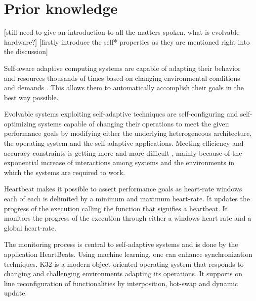 
\section{Prior knowledge}

[still need to give an introduction to all the matters spoken. what is evolvable hardware?]
[firstly introduce the self* properties as they are mentioned right into the discussion]

Self-aware adaptive computing systems are capable of adapting their behavior and resources thousands of times based on changing environmental conditions and demands \cite{selfaware}. 
This allows them to automatically accomplish their goals in the best way possible.

Evolvable systems exploiting self-adaptive techniques are self-configuring and self-optimizing systems capable of changing their operations to meet the given performance goals by modifying either the underlying heterogeneous architecture, the operating system and the self-adaptive applications. \cite{evolvable}
Meeting efficiency and accuracy constraints is getting more and more difficult , mainly because of the exponential increase of interactions among systems and the environments in which the systems are required to work. 

Heartbeat makes it possible to assert performance goals as heart-rate windows each of each is delimited by a minimum and maximum heart-rate. It updates the progress of the execution calling the function that signifies a heartbeat. It monitors the progress of the execution through either a windows heart rate and a global heart-rate.\cite{evolvable}

The monitoring process is central to self-adaptive systems and is done by the application HeartBeats. 
Using machine learning, one can enhance synchronization techniques. K32 is a modern object-oriented operating system that responds to changing and challenging environments adapting its operations. It supports on line reconfiguration of functionalities by interposition, hot-swap and dynamic update. \cite{evolvable}

